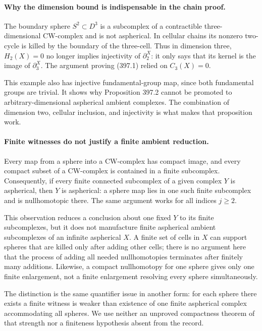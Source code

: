 \documentclass[11pt]{article}
\begin{document}
\paragraph{Why the dimension bound is indispensable in the chain proof.}
The boundary sphere $S^2\subset D^3$ is a subcomplex of a contractible
three-dimensional CW-complex and is not aspherical. In cellular chains
its nonzero two-cycle is killed by the boundary of the three-cell.
Thus in dimension three, $H_2(X)=0$ no longer implies injectivity of
$\partial_2^X$: it only says that its kernel is the image of
$\partial_3^X$. The argument proving (397.1) relied on $C_3(X)=0$.

This example also has injective fundamental-group map, since both
fundamental groups are trivial. It shows why Proposition 397.2 cannot
be promoted to arbitrary-dimensional aspherical ambient complexes.
The combination of dimension two, cellular inclusion, and injectivity
is what makes that proposition work.

\paragraph{Finite witnesses do not justify a finite ambient reduction.}
Every map from a sphere into a CW-complex has compact image, and every
compact subset of a CW-complex is contained in a finite subcomplex.
Consequently, if every finite connected subcomplex of a given complex
$Y$ is aspherical, then $Y$ is aspherical: a sphere map lies in one
such finite subcomplex and is nullhomotopic there. The same argument
works for all indices $j\ge2$.

This observation reduces a conclusion about one fixed $Y$ to its finite
subcomplexes, but it does not manufacture finite aspherical ambient
subcomplexes of an infinite aspherical $X$. A finite set of cells in
$X$ can support spheres that are killed only after adding other cells;
there is no argument here that the process of adding all needed
nullhomotopies terminates after finitely many additions. Likewise,
a compact nullhomotopy for one sphere gives only one finite enlargement,
not a finite enlargement resolving every sphere simultaneously.

The distinction is the same quantifier issue in another form: for each
sphere there exists a finite witness is weaker than existence of one
finite aspherical complex accommodating all spheres. We use neither
an unproved compactness theorem of that strength nor a finiteness
hypothesis absent from the record.
\end{document}
